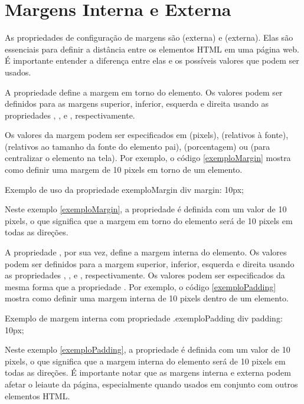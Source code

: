 \section{Margens Interna e Externa}

As propriedades de configuração de margens são  (externa) e  (externa). Elas são essenciais para definir a distância entre os elementos HTML em uma página web. É importante entender a diferença entre elas e os possíveis valores que podem ser usados.

A propriedade  define a margem em torno do elemento. Os valores podem ser definidos para as margens superior, inferior, esquerda e direita usando as propriedades , ,  e , respectivamente. 

Os valores da margem podem ser especificados em  (pixels),  (relativos à fonte),  (relativos ao tamanho da fonte do elemento pai), \var{\%} (porcentagem) ou  (para centralizar o elemento na tela). Por exemplo, o código \ref{exemploMargin} mostra como definir uma margem de 10 pixels em torno de um elemento.

\begin{csscode}{Exemplo de uso da propriedade }{exemploMargin}
div {
    margin: 10px;
}
\end{csscode}

Neste exemplo \ref{exemploMargin}, a propriedade  é definida com um valor de 10 pixels, o que significa que a margem em torno do elemento  será de 10 pixels em todas as direções.

A propriedade , por sua vez, define a margem interna do elemento. Os valores podem ser definidos para a margem superior, inferior, esquerda e direita usando as propriedades , ,  e , respectivamente. Os valores podem ser especificados da mesma forma que a propriedade . Por exemplo, o código \ref{exemploPadding} mostra como definir uma margem interna de 10 pixels dentro de um elemento.

\begin{csscode}{Exemplo de margem interna com propriedade .}{exemploPadding}
div {
    padding: 10px;
}
\end{csscode}

Neste exemplo \ref{exemploPadding}, a propriedade  é definida com um valor de 10 pixels, o que significa que a margem interna do elemento  será de 10 pixels em todas as direções. É importante notar que as margens interna e externa podem afetar o leiaute da página, especialmente quando usados em conjunto com outros elementos HTML. 

